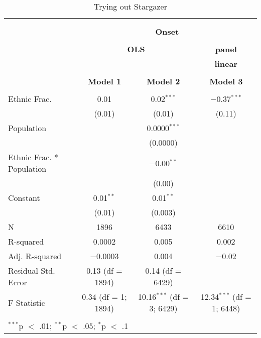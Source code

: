 \begin{table}[!h] \centering 
  \caption{Trying out Stargazer} 
  \label{tab:stargazer} 
\begin{tabular}{@{\extracolsep{5pt}}lccc} 
\\[-1.8ex]\hline \\[-1.8ex] 
\\[-1.8ex] & \multicolumn{3}{c}{\textbf{Onset}} \\ 
\\[-1.8ex] & \multicolumn{2}{c}{\textbf{OLS}} & \textbf{panel} \\ 
 & \multicolumn{2}{c}{\textbf{}} & \textbf{linear} \\ 
\\[-1.8ex] & \textbf{Model 1} & \textbf{Model 2} & \textbf{Model 3}\\ 
\hline \\[-1.8ex] 
 Ethnic Frac. & 0.01 & 0.02$^{***}$ & $-$0.37$^{***}$ \\ 
  & (0.01) & (0.01) & (0.11) \\ 
  Population &  & 0.0000$^{***}$ &  \\ 
  &  & (0.0000) &  \\ 
  Ethnic Frac. * Population &  & $-$0.00$^{**}$ &  \\ 
  &  & (0.00) &  \\ 
  Constant & 0.01$^{**}$ & 0.01$^{**}$ &  \\ 
  & (0.01) & (0.003) &  \\ 
 N & 1896 & 6433 & 6610 \\ 
R-squared & 0.0002 & 0.005 & 0.002 \\ 
Adj. R-squared & $-$0.0003 & 0.004 & $-$0.02 \\ 
Residual Std. Error & 0.13 (df = 1894) & 0.14 (df = 6429) &  \\ 
F Statistic & 0.34 (df = 1; 1894) & 10.16$^{***}$ (df = 3; 6429) & 12.34$^{***}$ (df = 1; 6448) \\ 
\hline \\[-1.8ex] 
\multicolumn{4}{l}{$^{***}$p $<$ .01; $^{**}$p $<$ .05; $^{*}$p $<$ .1} \\ 
\end{tabular} 
\end{table} 


